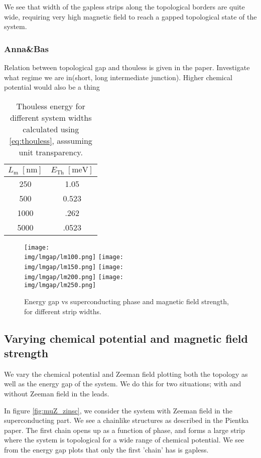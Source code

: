 \documentclass[10pt,a4paper]{article}
\newcommand{\img}{./images}
\begin{document}
	 We see that width of the gapless strips along the topological borders are quite wide, requiring very high magnetic field to reach a gapped topological state of the system.
 	\subsubsection{Anna\&Bas}
 	Relation between topological gap and thouless is given in the paper. Investigate what regime we are in(short, long intermediate junction). Higher chemical potential would also be a thing
	\begin{table}[H]
		\centering
		\begin{tabular}{|c|c|}
			\hline 
			$L_\text{m} \; [\si{\nm}]$ & $E_\text{Th} \; [\si{\meV}]$ \\ 
			\hline 
			250 & 1.05 \\ 
			\hline 
			500 & 0.523 \\ 
			\hline 
			1000 & .262 \\ 
			\hline 
			5000 & .0523 \\ 
			\hline 
		\end{tabular} 
		\caption{Thouless energy for different system widths calculated using \ref{eq:thouless}, asssuming unit transparency.}
		\label{table:thouless}
	\end{table}
	
	
	\begin{figure}[H]
		\texttt{[image: \\img/lmgap/lm100.png]}
		\texttt{[image: \\img/lmgap/lm150.png]}
		\texttt{[image: \\img/lmgap/lm200.png]}
		\texttt{[image: \\img/lmgap/lm250.png]}
		\caption{Energy gap vs superconducting phase and magnetic field strength, for different strip widths.}
		\label{fig:lmZPgap}
	\end{figure}
\newpage	
	\subsection{Varying chemical potential and magnetic field strength}
		We vary the chemical potential and Zeeman field plotting both the topology as well as the energy gap of the system.
		We do this for two situations; with and without Zeeman field in the leads.
		
		In figure \ref{fig:muZ_zinsc}, we consider the system with Zeeman field in the superconducting part.
		We see a chainlike structures as described in the Pientka paper.
		The first chain opens up as a function of phase, and forms a large strip where the system is topological for a wide range of chemical potential.
		We see from the energy gap plots that only the first 'chain' has is gapless.
		
\end{document}
